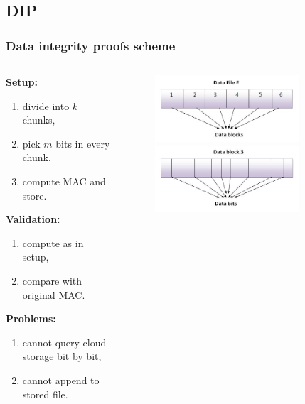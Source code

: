 \documentclass[compress]{beamer}
\begin{document}
\subsection{DIP}
\begin{frame}
\frametitle{\textbf{Data integrity proofs scheme}}
\begin{columns}
	\begin{column}{0.5\textwidth}
		\small
		\textbf{Setup:}
		\begin{enumerate}
			\item divide into $k$ chunks,
			\item pick $m$ bits in every chunk,
			\item compute MAC and store.
		\end{enumerate}
		\textbf{Validation:}
		\begin{enumerate}
			\item compute as in setup,
			\item compare with original MAC.
		\end{enumerate}
		\textbf{Problems:}
		\begin{enumerate}
			\item cannot query cloud storage bit by bit,
			\item cannot append to stored file.
		\end{enumerate}
	\end{column}
	\begin{column}{0.5\textwidth}
		\begin{figure}
			\centering
			\includegraphics[width=0.8\textwidth]{img/dip1.png}\\
			\includegraphics[width=0.8\textwidth]{img/dip2.png}\\

\end{figure}
\end{column}
\end{columns}
\end{frame}
\end{document}
